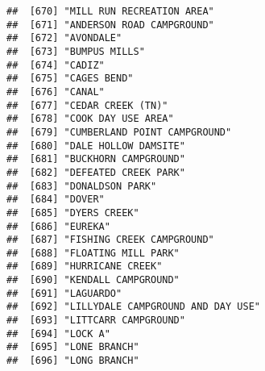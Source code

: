 \documentclass[
]{article}
\begin{document}
\begin{verbatim}
##  [670] "MILL RUN RECREATION AREA"                                                            
##  [671] "ANDERSON ROAD CAMPGROUND"                                                            
##  [672] "AVONDALE"                                                                            
##  [673] "BUMPUS MILLS"                                                                        
##  [674] "CADIZ"                                                                               
##  [675] "CAGES BEND"                                                                          
##  [676] "CANAL"                                                                               
##  [677] "CEDAR CREEK (TN)"                                                                    
##  [678] "COOK DAY USE AREA"                                                                   
##  [679] "CUMBERLAND POINT CAMPGROUND"                                                         
##  [680] "DALE HOLLOW DAMSITE"                                                                 
##  [681] "BUCKHORN CAMPGROUND"                                                                 
##  [682] "DEFEATED CREEK PARK"                                                                 
##  [683] "DONALDSON PARK"                                                                      
##  [684] "DOVER"                                                                               
##  [685] "DYERS CREEK"                                                                         
##  [686] "EUREKA"                                                                              
##  [687] "FISHING CREEK CAMPGROUND"                                                            
##  [688] "FLOATING MILL PARK"                                                                  
##  [689] "HURRICANE CREEK"                                                                     
##  [690] "KENDALL CAMPGROUND"                                                                  
##  [691] "LAGUARDO"                                                                            
##  [692] "LILLYDALE CAMPGROUND AND DAY USE"                                                    
##  [693] "LITTCARR CAMPGROUND"                                                                 
##  [694] "LOCK A"                                                                              
##  [695] "LONE BRANCH"                                                                         
##  [696] "LONG BRANCH"                                                                         

\end{verbatim}
\end{document}
